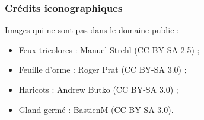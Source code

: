 \subsubsection*{Crédits iconographiques}
Images qui ne sont pas dans le domaine public :
\begin{itemize}
\item Feux tricolores : Manuel Strehl (CC BY-SA 2.5) ;
\item Feuille d’orme : Roger Prat (CC BY-SA 3.0) ;
\item Haricots : Andrew Butko (CC BY-SA 3.0) ;
\item Gland germé : BastienM (CC BY-SA 3.0).
\end{itemize}


